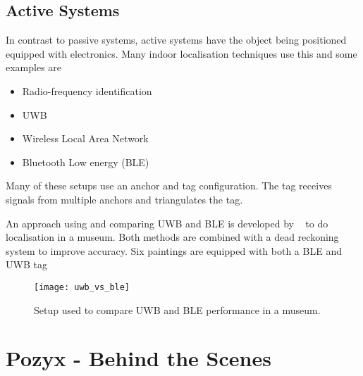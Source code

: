 \subsection*{Active Systems}
In contrast to passive systems, active systems have the object being positioned equipped with electronics.
Many indoor localisation techniques use this and some examples are ~\cite{deak2012survey}
\begin{itemize}
    \item Radio-frequency identification
    \item UWB
    \item Wireless Local Area Network
    \item Bluetooth Low energy (BLE)
\end{itemize}
Many of these setups use an anchor and tag configuration.
The tag receives signals from multiple anchors and triangulates the tag.

An approach using and comparing UWB and BLE is developed by ~\cite{findobjs} to do localisation in a museum.
Both methods are combined with a dead reckoning system to improve accuracy.
Six paintings are equipped with both a BLE and UWB tag

\begin{figure}[h!]
    \centering
    \texttt{[image: uwb\_vs\_ble]}
    \caption{Setup used to compare UWB and BLE performance in a museum.}
    \label{fig:uwbvsble}
\end{figure}

\section{Pozyx - Behind the Scenes}\label{sec:pozyx---behind-the-scenes}
